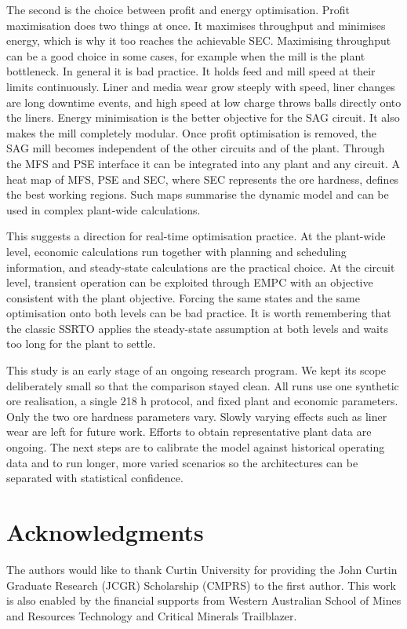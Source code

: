 \documentclass[conference]{IEEEtran}
\begin{document}
The second is the choice between profit and energy optimisation. Profit
maximisation does two things at once. It maximises throughput and
minimises energy, which is why it too reaches the achievable SEC.
Maximising throughput can be a good choice in some cases, for example
when the mill is the plant bottleneck. In general it is bad practice. It
holds feed and mill speed at their limits continuously. Liner and media
wear grow steeply with speed, liner changes are long downtime events,
and high speed at low charge throws balls directly onto the liners.
Energy minimisation is the better objective for the SAG circuit. It also
makes the mill completely modular. Once profit optimisation is removed,
the SAG mill becomes independent of the other circuits and of the plant.
Through the MFS and PSE interface it can be integrated into any plant
and any circuit. A heat map of MFS, PSE and SEC, where SEC represents
the ore hardness, defines the best working regions. Such maps summarise
the dynamic model and can be used in complex plant-wide calculations.

This suggests a direction for real-time optimisation practice. At the
plant-wide level, economic calculations run together with planning and
scheduling information, and steady-state calculations are the practical
choice. At the circuit level, transient operation can be exploited
through EMPC with an objective consistent with the plant objective.
Forcing the same states and the same optimisation onto both levels can
be bad practice. It is worth remembering that the classic SSRTO applies
the steady-state assumption at both levels and waits too long for the
plant to settle.

This study is an early stage of an ongoing research program. We kept
its scope deliberately small so that the comparison stayed clean. All
runs use one synthetic ore realisation, a single 218 h protocol, and
fixed plant and economic parameters. Only the two ore hardness
parameters vary. Slowly varying effects such as liner wear are left
for future work. Efforts to obtain representative plant data are
ongoing. The next steps are to calibrate the model against historical
operating data and to run longer, more varied scenarios so the
architectures can be separated with statistical confidence.

\section*{Acknowledgments}

The authors would like to thank Curtin University for providing the
John Curtin Graduate Research (JCGR) Scholarship (CMPRS) to the first
author. This work is also enabled by the financial supports from
Western Australian School of Mines and Resources Technology and
Critical Minerals Trailblazer.
\end{document}
